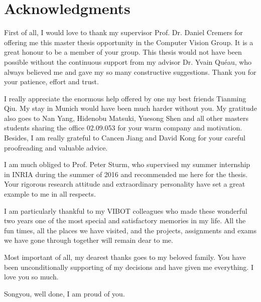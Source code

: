 \doublespacing

\setcounter{page}{1} \pagestyle{plain}


\tableofcontents

\listoffigures
\listoftables

\chapter*{Acknowledgments}
         {\protect{}}

First of all, I would love to thank my supervisor Prof. Dr. Daniel Cremers for offering me this master thesis opportunity in the Computer Vision Group. 
It is a great honour to be a member of your group. 
This thesis would not have been possible without the continuous support from my advisor Dr. Yvain Qu\'{e}au, who always believed me and gave my so many constructive suggestions. 
Thank you for your patience, effort and trust.

I really appreciate the enormous help offered by one my best friends Tianming Qiu.
My stay in Munich would have been much harder without you.
My gratitude also goes to Nan Yang, Hidenobu Matsuki, Yuesong Shen and all other masters students sharing the office 02.09.053 for your warm company and motivation. 
Besides, I am really grateful to Cancen Jiang and David Kong for your careful proofreading and valuable advice.

I am much obliged to Prof. Peter Sturm, who supervised my summer internship in INRIA during the summer of 2016 and recommended me here for the thesis.
Your rigorous research attitude and extraordinary personality have set a great example to me in all respects.

I am particularly thankful to my VIBOT colleagues who made these wonderful two years one of the most special and satisfactory memories in my life.
All the fun times, all the places we have visited, and the projects, assignments and exams we have gone through together will remain dear to me.

Most important of all, my dearest thanks goes to my beloved family.
You have been unconditionally supporting of my decisions and have given me everything. I love you so much.

Songyou, well done, I am proud of you.

\pagestyle{fancy}
